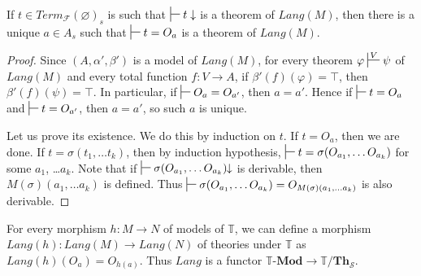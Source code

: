 \documentclass[reqno]{amsart}
\theoremstyle{definition}
\theoremstyle{remark}
\newcommand{\cat}[1]{\mathbf{#1}}
\newcommand{\Mod}[1]{#1\text{-}\cat{Mod}}
\newcommand{\Th}{\cat{Th}}
\numberwithin{figure}{section}
\begin{document}
\begin{lem}[cl-term]
If $t \in Term_\mathcal{F}(\varnothing)_s$ is such that $\sststile{}{} t \downarrow$ is a theorem of $Lang(M)$,
    then there is a unique $a \in A_s$ such that $\sststile{}{} t = O_a$ is a theorem of $Lang(M)$.
\end{lem}
\begin{proof}
Since $(A,\alpha',\beta')$ is a model of $Lang(M)$, for every theorem $\varphi \sststile{}{V} \psi$ of $Lang(M)$
    and every total function $f : V \to A$, if $\beta'(f)(\varphi) = \top$, then $\beta'(f)(\psi) = \top$.
In particular, if $\sststile{}{} O_a = O_{a'}$, then $a = a'$.
Hence if $\sststile{}{} t = O_a$ and $\sststile{}{} t = O_{a'}$, then $a = a'$, so such $a$ is unique.

Let us prove its existence.
We do this by induction on $t$.
If $t = O_a$, then we are done.
If $t = \sigma(t_1, \ldots t_k)$, then by induction hypothesis, $\sststile{}{} t = \sigma(O_{a_1}, \ldots O_{a_k})$ for some $a_1$, \ldots $a_k$.
Note that if $\sststile{}{} \sigma(O_{a_1}, \ldots O_{a_k})\!\!\downarrow$ is derivable, then $M(\sigma)(a_1, \ldots a_k)$ is defined.
Thus $\sststile{}{} \sigma(O_{a_1}, \ldots O_{a_k}) = O_{M(\sigma)(a_1, \ldots a_k)}$ is also derivable.
\end{proof}

For every morphism $h : M \to N$ of models of $\mathbb{T}$, we can define a morphism $Lang(h) : Lang(M) \to Lang(N)$ of theories under $\mathbb{T}$ as $Lang(h)(O_a) = O_{h(a)}$.
Thus $Lang$ is a functor $\Mod{\mathbb{T}} \to \mathbb{T}/\Th_\mathcal{S}$.
\end{document}
